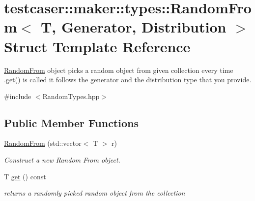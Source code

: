 \hypertarget{structtestcaser_1_1maker_1_1types_1_1RandomFrom}{}\section{testcaser\+:\+:maker\+:\+:types\+:\+:Random\+From$<$ T, Generator, Distribution $>$ Struct Template Reference}
\label{structtestcaser_1_1maker_1_1types_1_1RandomFrom}


\mbox{\hyperlink{structtestcaser_1_1maker_1_1types_1_1RandomFrom}{Random\+From}} object picks a random object from given collection every time .\mbox{\hyperlink{structtestcaser_1_1maker_1_1types_1_1RandomFrom_a6f72354c54f49a18de70b057a3b0f04b}{get()}} is called it follows the generator and the distribution type that you provide.  




{\ttfamily \#include $<$Random\+Types.\+hpp$>$}

\subsection*{Public Member Functions}
\begin{DoxyCompactItemize}
\item 
\mbox{\hyperlink{structtestcaser_1_1maker_1_1types_1_1RandomFrom_a02ca97de6a8f2c6012b1cfa0c4bfd4ce}{Random\+From}} (std\+::vector$<$ T $>$ r)
\begin{DoxyCompactList}\small\item\em Construct a new Random From object. \end{DoxyCompactList}\item 
T \mbox{\hyperlink{structtestcaser_1_1maker_1_1types_1_1RandomFrom_a6f72354c54f49a18de70b057a3b0f04b}{get}} () const
\begin{DoxyCompactList}\small\item\em returns a randomly picked random object from the collection \end{DoxyCompactList}\end{DoxyCompactItemize}
